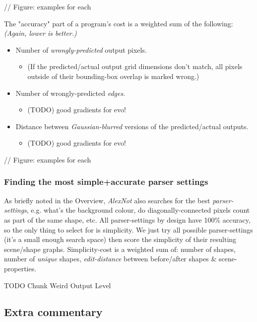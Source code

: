 \documentclass{article}
\begin{document}
// Figure: examples for each

The "accuracy" part of a program's cost is a weighted sum of the following: \textit{(Again, lower is better.)}

\begin{itemize}
    \item Number of \textit{wrongly-predicted} output pixels.
    \begin{itemize}
        \item (If the predicted/actual output grid dimensions don't match, all pixels outside of their bounding-box overlap is marked wrong.)
    \end{itemize}
    \item Number of wrongly-predicted \textit{edges}.
    \begin{itemize}
        \item (TODO) good gradients for evo!
    \end{itemize}
    \item Distance between \textit{Gaussian-blurred} versions of the predicted/actual outputs.
    \begin{itemize}
        \item (TODO) good gradients for evo!
    \end{itemize}
\end{itemize}

// Figure: examples for each

\subsubsection{Finding the most simple+accurate parser settings}

As briefly noted in the Overview, \textit{AlexNot} also searches for the best \textit{parser-settings}, e.g. what's the background colour, do diagonally-connected pixels count as part of the same shape, etc. All parser-settings by design have 100\% accuracy, so the only thing to select for is simplicity. We just try all possible parser-settings (it's a small enough search space) then score the simplicity of their resulting scene/shape graphs. Simplicity-cost is a weighted sum of: number of shapes, number of \textit{unique} shapes, \textit{edit-distance} between before/after shapes \& scene-properties.

TODO Chunk Weird Output Level 

\subsection{Extra commentary}
\end{document}
